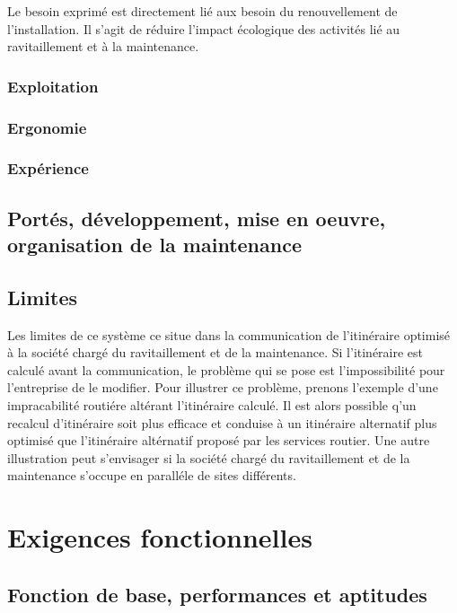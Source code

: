             Le besoin exprimé est directement lié aux besoin du renouvellement de l'installation. Il s'agit de réduire l'impact écologique des activités lié au ravitaillement et à la maintenance.
            
        \subsubsection{Exploitation}
        
            
        
        \subsubsection{Ergonomie}
        
        \subsubsection{Expérience}
    
    \subsection{Portés, développement, mise en oeuvre, organisation de la maintenance}
    
    \subsection{Limites}
    
        Les limites de ce système ce situe dans la communication de l'itinéraire optimisé à la société chargé du ravitaillement et de la maintenance.
        Si l'itinéraire est calculé avant la communication, le problème qui se pose est l'impossibilité pour l'entreprise de le modifier.
        Pour illustrer ce problème, prenons l'exemple d'une impracabilité routiére altérant l'itinéraire calculé. Il est alors possible q'un recalcul d'itinéraire soit plus efficace et conduise à un itinéraire alternatif plus optimisé que l'itinéraire altérnatif proposé par les services routier.
        Une autre illustration peut s'envisager si la société chargé du ravitaillement et de la maintenance s'occupe en paralléle de sites différents.
        
\section{Exigences fonctionnelles}

    \subsection{Fonction de base, performances et aptitudes}

